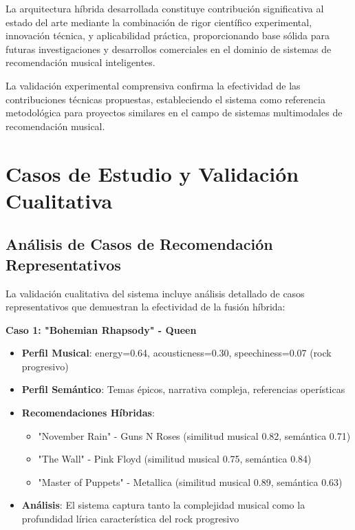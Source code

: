 \documentclass[12pt,a4paper]{report}
\begin{document}
La arquitectura híbrida desarrollada constituye contribución significativa al estado del arte mediante la combinación de rigor científico experimental, innovación técnica, y aplicabilidad práctica, proporcionando base sólida para futuras investigaciones y desarrollos comerciales en el dominio de sistemas de recomendación musical inteligentes.

La validación experimental comprensiva confirma la efectividad de las contribuciones técnicas propuestas, estableciendo el sistema como referencia metodológica para proyectos similares en el campo de sistemas multimodales de recomendación musical.

\section{Casos de Estudio y Validación Cualitativa}

\subsection{Análisis de Casos de Recomendación Representativos}

La validación cualitativa del sistema incluye análisis detallado de casos representativos que demuestran la efectividad de la fusión híbrida:

\textbf{Caso 1: "Bohemian Rhapsody" - Queen}
\begin{itemize}
\item \textbf{Perfil Musical}: energy=0.64, acousticness=0.30, speechiness=0.07 (rock progresivo)
\item \textbf{Perfil Semántico}: Temas épicos, narrativa compleja, referencias operísticas
\item \textbf{Recomendaciones Híbridas}:
  \begin{itemize}
  \item "November Rain" - Guns N\textquotesingle{} Roses (similitud musical 0.82, semántica 0.71)
  \item "The Wall" - Pink Floyd (similitud musical 0.75, semántica 0.84)
  \item "Master of Puppets" - Metallica (similitud musical 0.89, semántica 0.63)
  \end{itemize}
\item \textbf{Análisis}: El sistema captura tanto la complejidad musical como la profundidad lírica característica del rock progresivo
\end{itemize}
\end{document}
